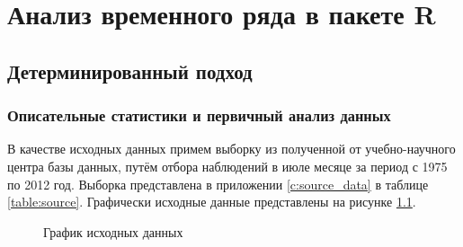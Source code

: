 
\newcommand{\inp}[1]{}
\newcommand{\characteristic}[2]{\inp{#1/characteristics/#2}}
\newcommand{\descriptive}[2]{\inp{#1/descriptive/#2}}
\newcommand{\test}[3]{\inp{#1/test/#2/#3}}
\newcommand{\normaldistr}{$\mathcal{N}(\descriptive{original}{mean}, \descriptive{original}{variance})$}

\newpage

\chapter{Анализ временного ряда в пакете R}

\section{Детерминированный подход} %
\label{sec:determenistic}

\subsection{Описательные статистики и первичный анализ данных} %
\label{sec:basis}

В качестве исходных данных примем выборку из полученной от учебно-научного центра базы данных, путём отбора наблюдений в июле месяце за период с 1975 по 2012 год. Выборка представлена в приложении \ref{c:source_data} в таблице \ref{table:source}. Графически исходные данные представлены на рисунке \ref{img:input}.

\begin{figure}[ht]
\caption{График исходных данных}
\label{img:input}
\end{figure}

